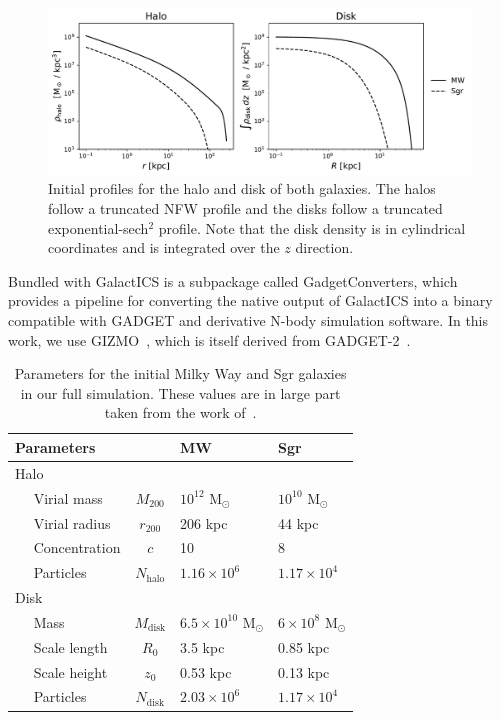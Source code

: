 \begin{figure}
    \centering
    \includegraphics[width=0.9\linewidth]{figs/init_profiles.pdf}
    \caption{%
        Initial profiles for the halo and disk of both galaxies. The halos
        follow a truncated NFW profile and the disks follow a truncated
        exponential-sech$^2$ profile. Note that the disk density is in
        cylindrical coordinates and is integrated over the $z$ direction.
    }
    \label{fig:init_profiles}
\end{figure}

Bundled with GalactICS is a subpackage called GadgetConverters, which
provides a pipeline for converting the native output of GalactICS into a
binary compatible with GADGET and derivative N-body simulation software. In
this work, we use GIZMO~\cite{hopkins_new_2015}, which is itself derived from
GADGET-2~\cite{springel_cosmological_2005}.

\begin{table}
\centering
\begin{tabular}{lcll}
    \toprule
    Parameters & & MW & Sgr \\
    \midrule 
    Halo \\
    $\quad$ Virial mass & $M_{200}$ & $10^{12}$ M$_\odot$ & $10^{10}$ M$_\odot$ \\
    $\quad$ Virial radius & $r_{200}$ & 206 kpc & 44 kpc \\
    $\quad$ Concentration & $c$ & 10 & 8 \\
    $\quad$ Particles & $N_{\text{halo}}$ & $1.16 \times 10^{6}$ & $1.17 \times
    10^{4}$ \\
    Disk \\
    $\quad$ Mass & $M_{\text{disk}}$ & $6.5 \times 10^{10}$ M$_\odot$ & $6 \times 10^{8}$ M$_\odot$ \\
    $\quad$ Scale length & $R_0$ & 3.5 kpc & 0.85 kpc \\
    $\quad$ Scale height & $z_0$ & 0.53 kpc & 0.13 kpc \\
    $\quad$ Particles & $N_{\text{disk}}$ & $2.03 \times 10^{6}$ & $1.17 \times
    10^{4}$ \\
    \bottomrule
\end{tabular}
\caption{%
    Parameters for the initial Milky Way and Sgr galaxies in our full
    simulation. These values are in large part taken from the work
    of~\cite{dierickx_predicted_2017}.
}
\label{tab:sim_params}
\end{table}

